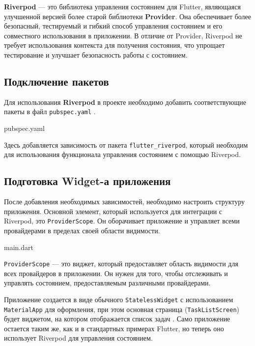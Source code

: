 \textbf{Riverpod} --- это библиотека управления состоянием для Flutter,
являющаяся улучшенной версией более старой библиотеки \textbf{Provider}.
Она обеспечивает более безопасный, тестируемый
и гибкий способ управления состоянием
и его совместного использования в приложении.
В отличие от Provider, Riverpod не требует использования контекста
для получения состояния, что упрощает тестирование
и улучшает безопасность работы с состоянием.

\subsection{Подключение пакетов}

Для использования \textbf{Riverpod}
в проекте необходимо добавить соответствующие пакеты
в файл \texttt{pubspec.yaml} .

\begin{image}
	\caption{pubspec.yaml}
	\label{fig:riverpod:pubspec}
\end{image}

Здесь добавляется зависимость от пакета \texttt{flutter\_riverpod},
который необходим для использования функционала управления
состоянием с помощью Riverpod.

\subsection{Подготовка Widget-а приложения}

После добавления необходимых зависимостей,
необходимо настроить структуру приложения.
Основной элемент, который используется для интеграции с Riverpod,
это \texttt{ProviderScope}.
Он оборачивает приложение и управляет всеми провайдерами
в пределах своей области видимости.

\begin{image}
	\caption{main.dart}
	\label{fig:riverpod:main}
\end{image}

\texttt{ProviderScope} --- это виджет,
который предоставляет область видимости для всех провайдеров в приложении.
Он нужен для того, чтобы отслеживать и управлять состоянием,
предоставляемым различными провайдерами.

Приложение создается в виде обычного \texttt{StatelessWidget}
с использованием \texttt{MaterialApp} для оформления,
при этом основная страница (\texttt{TaskListScreen}) будет виджетом,
на котором отображается список задач .
Само приложение остается таким же, как и в стандартных примерах Flutter,
но теперь оно использует Riverpod для управления состоянием.

